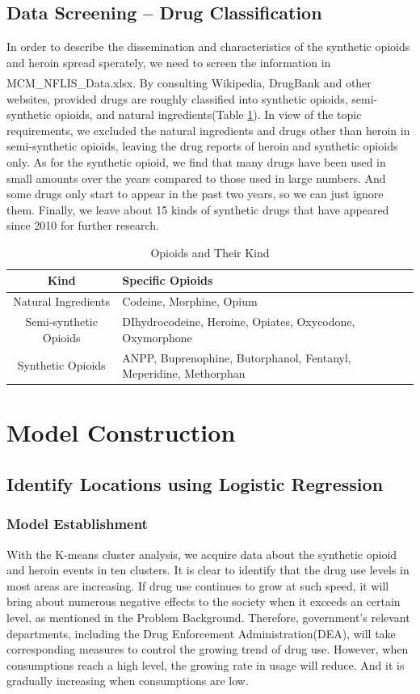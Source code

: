 \documentclass[12pt]{article}
\newcommand{\upcite}[1]{\textsuperscript{\textsuperscript{\cite{#1}}}}
\begin{document}
\subsection{Data Screening -- Drug Classification}
In order to describe the dissemination and characteristics of the synthetic opioids and heroin spread sperately, we need to screen the information in MCM\_NFLIS\_Data.xlsx. By consulting Wikipedia, DrugBank\upcite{4} and other websites, provided drugs are roughly classified into synthetic opioids, semi-synthetic opioids, and natural ingredients(Table \ref{opioid kind}). In view of the topic requirements, we excluded the natural ingredients and drugs other than heroin in semi-synthetic opioids, leaving the drug reports of heroin and synthetic opioids only. As for the synthetic opioid, we find that many drugs have been used in small amounts over the years compared to those used in large numbers. And some drugs only start to appear in the past two years, so we can just ignore them. Finally, we leave about 15 kinds of synthetic drugs that have appeared since 2010 for further research.
\begin{table}[H]
	\small
	\centering
	\caption{Opioids and Their Kind}
	\begin{tabular}{c|l}
	\hline
	Kind & Specific Opioids\\
	\hline
	Natural Ingredients	& Codeine, Morphine, Opium \\
	\hline
	Semi-synthetic Opioids & DIhydrocodeine, Heroine, Opiates, Oxycodone, Oxymorphone\\
	\hline
	Synthetic Opioids &  ANPP, Buprenophine, Butorphanol, Fentanyl, Meperidine, Methorphan\\
	\hline
	\end{tabular}
	\label{opioid kind}
\end{table}

\section{Model Construction}
\subsection{Identify Locations using Logistic Regression}
\subsubsection{Model Establishment}
With the K-means cluster analysis, we acquire data about the synthetic opioid and heroin events in ten clusters. It is clear to identify that the drug use levels in most areas are increasing. If drug use continues to grow at such speed, it will bring about numerous negative effects to the society when it exceeds an certain level, as mentioned in the Problem Background. Therefore, government’s relevant departments, including the Drug Enforcement Administration(DEA), will take corresponding measures to control the growing trend of drug use. However, when consumptions reach a high level, the growing rate in usage will reduce. And it is gradually increasing when consumptions are low.
\end{document}
